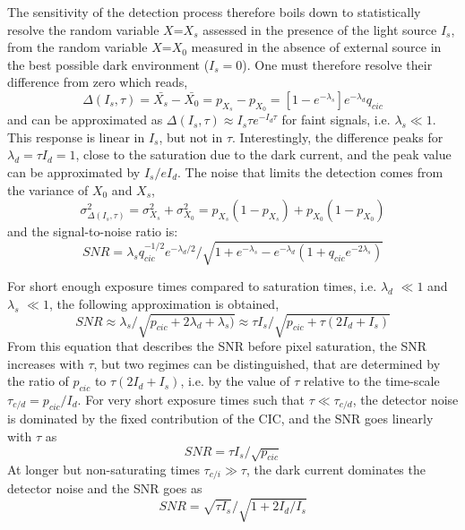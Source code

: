 \documentclass{article}
\begin{document}
The sensitivity of the detection process therefore boils down to statistically resolve the random variable $X$=$X_s$ assessed in the presence of the light source $I_{s}$, from the random variable $X$=$X_0$ measured in the absence of external source in the best possible dark environment ($I_{s}=0$).
One must therefore resolve their difference from zero which reads,
\begin{equation}
\Delta(I_{s},\tau)   = \bar{X_s}-\bar{X_0} = p_{X_s}-p_{X_0}= [1-e^{-\lambda_{s}}] e^{-\lambda_{d}} q_{cic}
\end{equation}
and can be approximated as $\Delta(I_{s},\tau) \approx I_{s} \tau e^{-I_{d} \tau}$ for faint signals, i.e. $\lambda_{s} \ll 1$.
This response is linear in $I_{s}$, but not in $\tau$. 
Interestingly, the difference peaks for $\lambda_{d} = \tau I_{d} = 1$, close to the saturation due to the dark current, and the peak value can be approximated by $I_{s}/e I_{d}$.
The noise that limits the detection comes from the variance of $X_0$ and $X_{s}$, 
\begin{equation}
\sigma^2_{\Delta(I_{s},\tau)} = \sigma^2_{X_s} + \sigma^2_{X_0} = p_{X_s}(1-p_{X_s}) + p_{X_0}(1-p_{X_0})  
\end{equation}
and the signal-to-noise ratio is:
\begin{equation}
\label{eq:SNR_main}
SNR = \lambda_{s} q_{cic}^{-1/2} e^{-\lambda_{d}/2} 
/\sqrt{ 1 + e^{-\lambda_{s}} - e^{-\lambda_{d}} (1 + q_{cic} e^{-2 \lambda_{s}})} 
\end{equation}

For short enough exposure times compared to saturation times, i.e. $\lambda_{d}$ $\ll 1$ and $\lambda_{s}$ $\ll 1$, the following approximation is obtained,
\begin{equation}
SNR \approx \lambda_{s} /\sqrt{p_{cic} + 2\lambda_{d} + \lambda_{s})}
    \approx \tau I_{s}   / \sqrt{p_{cic} + \tau (2 I_{d} + I_{s})}
\end{equation}
From this equation that describes the SNR before pixel saturation, the SNR increases with $\tau$, but two regimes can be distinguished, that are determined by the ratio of $p_{cic}$ to $\tau (2 I_{d} + I_{s})$, i.e. by the value of $\tau$ relative to the time-scale 
$\tau_{c/d} = p_{cic} /I_{d} $.
For very short exposure times such that 
$\tau \ll \tau_{c/d}$, 
the detector noise is dominated by the fixed contribution of the CIC, and the SNR goes linearly with $\tau$ as
\begin{equation}
    SNR=\tau I_{s} /\sqrt{p_{cic}}
\end{equation}
At longer but non-saturating times $\tau_{c/i} \gg \tau $, the dark current dominates the detector noise and the SNR goes as 
\begin{equation}
    SNR= \sqrt{\tau I_{s}} /\sqrt{ 1 + 2 I_{d}/I_{s}}
\end{equation}
\end{document}
